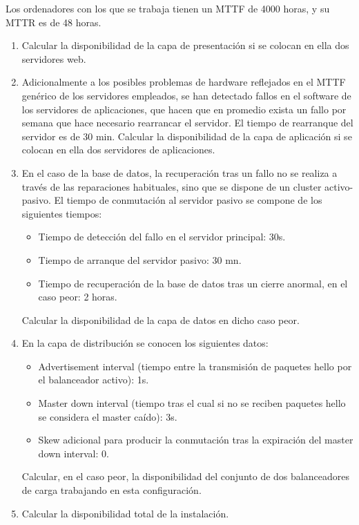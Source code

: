 Los ordenadores con los que se trabaja tienen un MTTF de 4000 horas, y su MTTR es de 48 horas.
\begin{enumerate}
	\item Calcular la disponibilidad de la capa de presentación si se colocan en ella dos servidores web.
	\item Adicionalmente a los posibles problemas de hardware reflejados
en el MTTF genérico de los servidores empleados, se han detectado fallos
 en el software de los servidores de aplicaciones, que hacen que en
promedio exista un fallo por semana que hace necesario rearrancar el
servidor. El tiempo de rearranque del servidor es de 30 min. Calcular la
disponibilidad de la capa de aplicación si se colocan en ella dos
servidores de aplicaciones.
	\item En el caso de la base de datos, la recuperación tras un fallo
no se realiza a través de las reparaciones habituales, sino que se
dispone de un cluster activo-pasivo. El tiempo de conmutación al
servidor pasivo se compone de los siguientes tiempos:
\begin{itemize}
	\item Tiempo de detección del fallo en el servidor principal: 30s.
	\item Tiempo de arranque del servidor pasivo: 30 mn.
	\item Tiempo de recuperación de la base de datos tras un cierre anormal, en el caso peor: 2 horas.

\end{itemize}

Calcular la disponibilidad de la capa de datos en dicho caso peor.
	\item En la capa de distribución se conocen los siguientes datos:
\begin{itemize}
	\item Advertisement interval (tiempo entre la transmisión de paquetes hello por el balanceador activo): 1s.
	\item Master down interval (tiempo tras el cual si no se reciben paquetes hello se considera el master caído): 3s.
	\item Skew adicional para producir la conmutación tras la expiración del master down interval: 0.

\end{itemize}

Calcular, en el caso peor, la disponibilidad del conjunto de dos balanceadores de carga trabajando en esta configuración.
	\item Calcular la disponibilidad total de la instalación.
\end{enumerate}

\TheSolution
